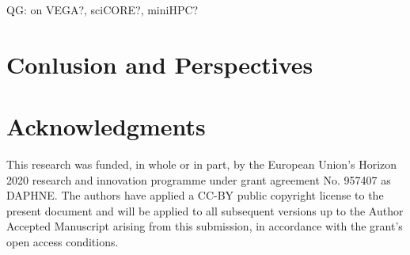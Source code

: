 \documentclass[conference,10pt]{IEEEtran}
\newcommand{\qg}[1]{{\color{blue} QG: #1}} %
\begin{document}
\qg{on VEGA?, sciCORE?, miniHPC?}


\section{Conlusion and Perspectives}

\section*{Acknowledgments}

This research was funded, in whole or in part, by the European Union’s Horizon 2020 research and innovation programme under grant agreement No. 957407 as DAPHNE.
The authors have applied a CC-BY public copyright license to the present document and will be applied to all subsequent versions up to the Author Accepted Manuscript arising from this submission, in accordance with the grant’s open access conditions.

\printbibliography
\end{document}
